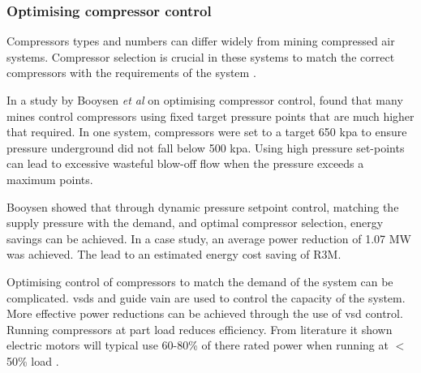 		\subsubsection{Optimising compressor control}
		Compressors types and numbers can differ widely from mining compressed air systems. Compressor selection is crucial in these systems to match the correct compressors with the requirements of the system \cite{marais2010expert}.
		\par 
		In a study by Booysen \textit{et al} \cite{Booysen2012Masters} on optimising compressor control, \cite{Booysen2012Masters} found that many mines control compressors using fixed target pressure points that are much higher that required. In one system, compressors were set to a target 650 \gls{kpa} to ensure pressure underground did not fall below 500 \gls{kpa}. Using high pressure set-points can lead to excessive wasteful blow-off flow when the pressure exceeds a maximum points.
		\par
		Booysen \cite{booysen2009optimising} showed that through dynamic pressure setpoint control, matching the supply pressure with the demand, and optimal compressor selection, energy savings can be achieved. In a case study, an average power reduction of 1.07 MW was achieved. The lead to an estimated energy cost saving of R3M.
		\par 
	 	Optimising control of compressors to match the demand of the system can be complicated. \glspl{vsd} and guide vain are used to control the capacity of the system. More effective power reductions can be achieved through the use of \gls{vsd} control. Running compressors at part load reduces efficiency. From literature it shown electric motors will typical use 60-80\% of there rated power when running at $<$50\% load \cite{Saidur2010}.
		
		
